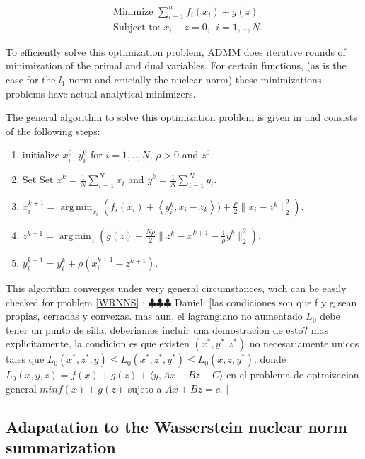 \documentclass[12pt]{amsart}
\theoremstyle{remark}
\DeclareMathOperator*{\argmin}{arg\,min}
\newcommand{\ddr}[1]{{\color{blue} \sf $\clubsuit\clubsuit\clubsuit$ Daniel: [#1]}}
\begin{document}
\begin{equation}\label{GVC}
\begin{aligned}
& \text{Minimize   } \sum_{i=1}^n f_i(x_i)+g(z) \\
&\text{Subject to: } x_i-z = 0, \ \ i=1,..,N. 
\end{aligned}
\end{equation}



To efficiently solve this optimization problem, ADMM does iterative rounds of minimization of the primal and dual variables. For certain functions, (as is the case for the $l_1$ norm and crucially the nuclear norm) these minimizations problems have actual analytical minimizers. 


The general algorithm to solve this optimization problem is given in \cite{boyd2011distributed} and consists of the following steps:

\begin{enumerate}
\item initialize $x^0_i$, $y^0_i$ for $i=1,..,N$, $\rho>0$ and $z^0$.
\item Set $ \text{Set } \bar{x}^{k} = \frac{1}{N}\sum_{i=1}^N x_i $ and $\bar{y}^{k} = \frac{1}{N}\sum_{i=1}^N y_i $.
\item $x_i^{k+1} = \argmin_{x_i} \left( f_i(x_i) + \left \langle y_i^k,x_i-z_k \right \rangle) +\frac{\rho}{2}\|x_i-z^k\|_2^2\right ).$
\item $z^{k+1} = \argmin_z \left (g(z)+\frac{N\rho}{2}\|z^k-\bar{x}^{k+1} -\frac{1}{\rho}\bar{y}^k \|_2^2 \right ).$
\item $y_i^{k+1} = y_i^k + \rho(x_i^{k+1}-z^{k+1}).$
\end{enumerate}

This algorithm converges under very general circumstances, wich can be easily checked for problem \ref{WRNNS} :
\ddr{las condiciones son que f y g sean propias, cerradas y convexas. mas aun, el lagrangiano no aumentado $L_0$ debe tener un punto de silla. deberiamos incluir una demostracion de esto? mas explicitamente, la condicion es que 
existen $(x^*,y^*,z^*)$ no necesariamente unicos tales que $L_0(x^*,z^*,y)\leq L_0(x^*,z^*,y^*) \leq L_0(x,z,y^*).$ donde 
$L_0(x,y,z)= f(x)+g(z)+ \langle y, Ax-Bz-C\rangle $ en el problema de optmizacion general $min f(x)+g(z)$ sujeto a $Ax+Bz = c$.
}



\subsection{Adapatation to the Wasserstein nuclear norm summarization}
\end{document}
